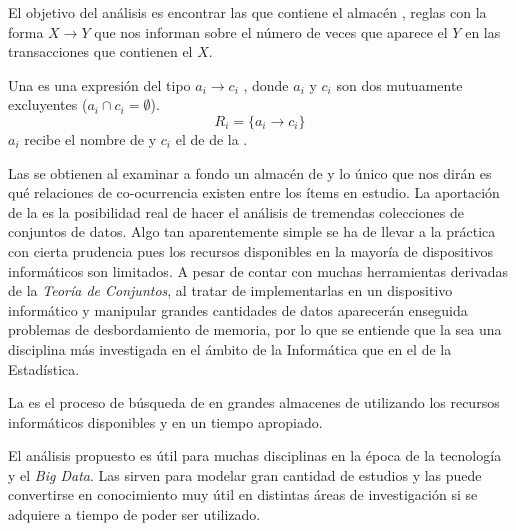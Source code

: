 El objetivo del análisis es encontrar las \ARs que contiene el almacén \D, reglas con la forma $X\rightarrow Y$ que nos informan sobre el número de veces que aparece el \itemset $Y$ en las transacciones que contienen el \itemset $X$.

\begin{Definition}[\AR]
   Una \AR es una expresión del tipo $a_i \rightarrow c_i$ , donde $a_i$ y $c_i$ son dos \itemsets mutuamente excluyentes ($a_i \cap c_i = \emptyset$).
  \begin{equation}\label{eqARi}
      R_i = \{a_i\rightarrow c_i\}
  \end{equation}
   \noindent $a_i$ recibe el nombre de \antecedente y $c_i$ el de \consecuente de la \ar.
\label{def:1-3-2-AR}
\end{Definition}

Las \ars se obtienen al examinar a fondo un almacén de \transacciones y lo único que nos dirán es qué relaciones de co-ocurrencia existen entre los ítems en estudio. La aportación de la \arm es la posibilidad real de hacer el análisis de tremendas colecciones de conjuntos de datos. Algo tan aparentemente simple se ha de llevar a la práctica con cierta prudencia pues los recursos disponibles en la mayoría de dispositivos informáticos son limitados. A pesar de contar con muchas herramientas derivadas de la \emph{Teoría de Conjuntos}, al tratar de implementarlas en un dispositivo informático y manipular grandes cantidades de datos aparecerán enseguida problemas de desbordamiento de memoria, por lo que se entiende que la \arm sea una disciplina más investigada en el ámbito de la Informática que en el de la Estadística.

\begin{Definition}
   La \arm es el proceso de búsqueda de \ARs en grandes almacenes de \transacciones utilizando los recursos informáticos disponibles y en un tiempo apropiado.
\label{def:1-3-2-ARM}
\end{Definition}

El análisis propuesto es útil para muchas disciplinas en la época de la tecnología y el \emph{Big Data}. Las \transacciones sirven para modelar gran cantidad de estudios y las \ars puede convertirse en conocimiento muy útil en distintas áreas de investigación si se adquiere a tiempo de poder ser utilizado.

